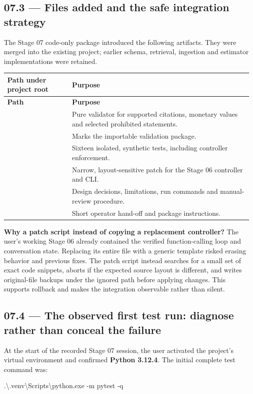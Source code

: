 \documentclass[11pt,a4paper]{article}
\DeclareRobustCommand{\code}[1]{{\ttfamily\small\detokenize{#1}}}
\begin{document}
\subsection{07.3 --- Files added and the safe integration strategy}
The Stage 07 code-only package introduced the following artifacts. They were merged into the existing project; earlier schema, retrieval, ingestion and estimator implementations were retained.
\begin{longtable}{@{}L{70mm}L{75mm}@{}}
\toprule
\textbf{Path under project root} & \textbf{Purpose}\\\midrule\endfirsthead
\toprule\textbf{Path} & \textbf{Purpose}\\\midrule\endhead
{} & Pure validator for supported citations, monetary values and selected prohibited statements.\\
 & Marks the importable validation package.\\
 & Sixteen isolated, synthetic tests, including controller enforcement.\\
 & Narrow, layout-sensitive patch for the Stage 06 controller and CLI.\\
 & Design decisions, limitations, run commands and manual-review procedure.\\
 & Short operator hand-off and package instructions.\\
\bottomrule
\end{longtable}

\textbf{Why a patch script instead of copying a replacement controller?} The user's working Stage 06 already contained the verified function-calling loop and conversation state. Replacing its entire file with a generic template risked erasing behavior and previous fixes. The patch script instead searches for a small set of exact code snippets, aborts if the expected source layout is different, and writes original-file backups under the ignored \code{local_cache/stage07_backups/} path before applying changes. This supports rollback and makes the integration observable rather than silent.

\subsection{07.4 --- The observed first test run: diagnose rather than conceal the failure}
At the start of the recorded Stage 07 session, the user activated the project's virtual environment and confirmed \textbf{Python 3.12.4}. The initial complete test command was:
\begin{examplebox}
\footnotesize\ttfamily
.\textbackslash.venv\textbackslash Scripts\textbackslash python.exe -m pytest -q
\end{examplebox}
\end{document}

